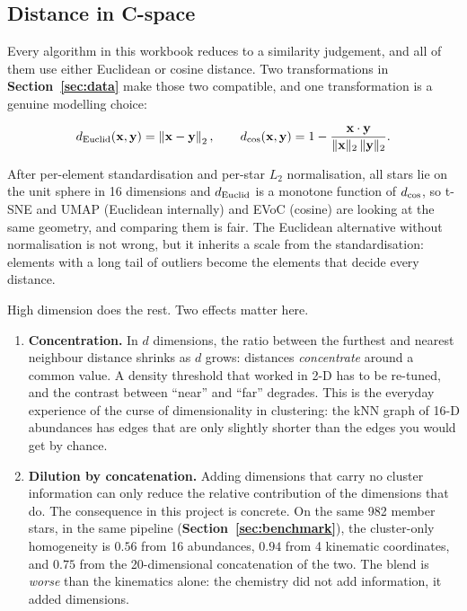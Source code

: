 \begin{marginnote}[]  
\end{marginnote}

\subsection{Distance in C-space}

Every algorithm in this workbook reduces to a similarity judgement, and all of
them use either Euclidean or cosine distance. Two transformations in
\textbf{Section~\ref{sec:data}} make those two compatible, and one
transformation is a genuine modelling choice:

\[
d_{\rm Euclid}(\mathbf{x},\mathbf{y}) = \left\| \mathbf{x} - \mathbf{y}
\right\|_2, \qquad
d_{\rm cos}(\mathbf{x},\mathbf{y}) = 1 - \frac{\mathbf{x}\cdot\mathbf{y}}
{\|\mathbf{x}\|_2\,\|\mathbf{y}\|_2}.
\]

After per-element standardisation and per-star $L_2$ normalisation, all stars
lie on the unit sphere in 16 dimensions and $d_{\rm Euclid}$ is a monotone
function of $d_{\rm cos}$, so t-SNE and UMAP (Euclidean internally) and EVoC
(cosine) are looking at the same geometry, and comparing them is fair. The
Euclidean alternative without normalisation is not wrong, but it inherits a
scale from the standardisation: elements with a long tail of outliers become
the elements that decide every distance.

High dimension does the rest. Two effects matter here.

\begin{enumerate}
\item \textbf{Concentration.} In $d$ dimensions, the ratio between the
  furthest and nearest neighbour distance shrinks as $d$ grows: distances
  \emph{concentrate} around a common value. A density threshold that worked in
  2-D has to be re-tuned, and the contrast between ``near'' and ``far''
  degrades. This is the everyday experience of the curse of dimensionality in
  clustering: the kNN graph of 16-D abundances has edges that are only
  slightly shorter than the edges you would get by chance.
\item \textbf{Dilution by concatenation.} Adding dimensions that carry no
  cluster information can only reduce the relative contribution of the
  dimensions that do. The consequence in this project is concrete. On the same
  982 member stars, in the same pipeline
  (\textbf{Section~\ref{sec:benchmark}}), the cluster-only homogeneity is
  $0.56$ from 16 abundances, $0.94$ from 4 kinematic coordinates, and
  $0.75$ from the 20-dimensional concatenation of the two. The blend is
  \emph{worse} than the kinematics alone: the chemistry did not add
  information, it added dimensions.
\end{enumerate}

